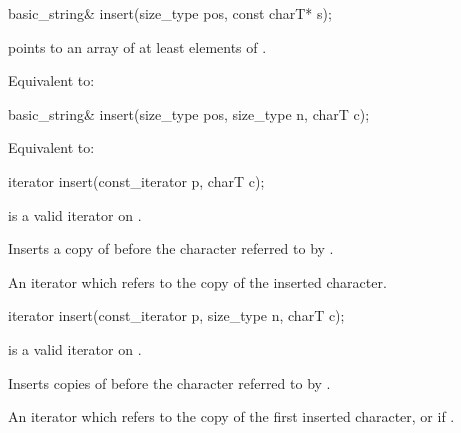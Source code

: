 %
\begin{itemdecl}
basic_string& insert(size_type pos, const charT* s);
\end{itemdecl}

\begin{itemdescr}
\pnum
\requires {} points to an array of at least
 elements of .

\pnum
\effects Equivalent to: 
\end{itemdescr}

%
\begin{itemdecl}
basic_string& insert(size_type pos, size_type n, charT c);
\end{itemdecl}

\begin{itemdescr}
\pnum
\effects Equivalent to: 
\end{itemdescr}

%
\begin{itemdecl}
iterator insert(const_iterator p, charT c);
\end{itemdecl}

\begin{itemdescr}
\pnum
\requires
{} is a valid iterator on
.

\pnum
\effects
Inserts a copy of  before the character referred to by .

\pnum
\returns
An iterator which refers to the copy of the inserted character.
\end{itemdescr}

%
\begin{itemdecl}
iterator insert(const_iterator p, size_type n, charT c);
\end{itemdecl}

\begin{itemdescr}
\pnum
\requires
{} is a valid iterator on
.

\pnum
\effects
Inserts  copies of  before the character referred to by .

\pnum
\returns An iterator which refers to the copy of the first inserted character, or
 if .
\end{itemdescr}

